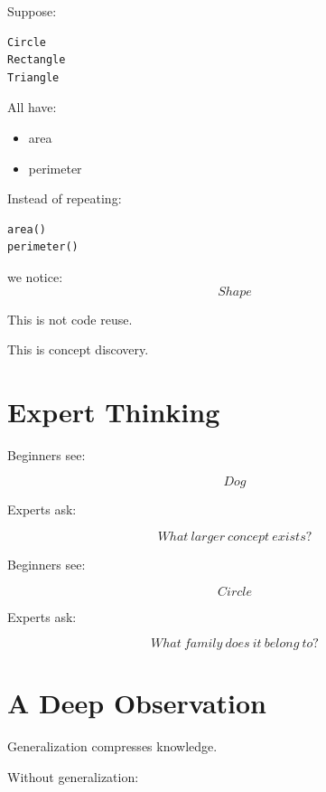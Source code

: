 \documentclass[11pt,a4paper]{book}
\begin{document}
Suppose:

\begin{verbatim}
Circle
Rectangle
Triangle
\end{verbatim}

All have:

\begin{itemize}
\item area
\item perimeter
\end{itemize}


Instead of repeating:

\begin{verbatim}
area()
perimeter()
\end{verbatim}

we notice: \[Shape\]


This is not code reuse.

This is concept discovery.


\section{Expert Thinking}

Beginners see:

\[
Dog
\]

Experts ask:

\[
What\ larger\ concept\ exists?
\]


Beginners see:

\[
Circle
\]

Experts ask:

\[
What\ family\ does\ it\ belong\ to?
\]


\section{A Deep Observation}

Generalization compresses knowledge.


Without generalization:
\end{document}
